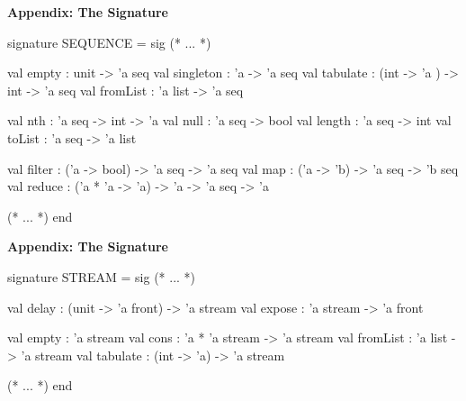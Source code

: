 \newpage

\textbf{Appendix: The  Signature}

\begin{codeblock}
  signature SEQUENCE =
    sig
      (* ... *)

      val empty : unit -> 'a seq
      val singleton : 'a -> 'a seq
      val tabulate : (int -> 'a ) -> int -> 'a seq
      val fromList : 'a list -> 'a seq

      val nth : 'a seq -> int -> 'a
      val null : 'a seq -> bool
      val length : 'a seq -> int
      val toList : 'a seq -> 'a list

      val filter : ('a -> bool) -> 'a seq -> 'a seq
      val map : ('a -> 'b) -> 'a seq -> 'b seq
      val reduce : ('a * 'a -> 'a) -> 'a -> 'a seq -> 'a

      (* ... *)
    end
\end{codeblock}

\vspace{20pt}

\textbf{Appendix: The  Signature}

\begin{codeblock}
signature STREAM =
  sig
    (* ... *)

    val delay : (unit -> 'a front) -> 'a stream
    val expose : 'a stream -> 'a front

    val empty : 'a stream
    val cons : 'a * 'a stream -> 'a stream
    val fromList : 'a list -> 'a stream
    val tabulate : (int -> 'a) -> 'a stream

    (* ... *)
  end
\end{codeblock}




